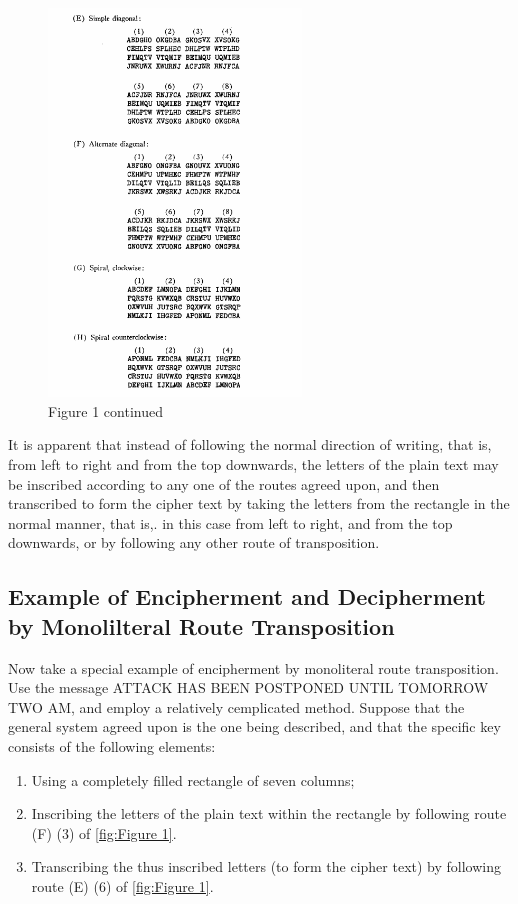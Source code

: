 \begin{figure}[h]
  \centering
    \includegraphics[width=0.6\textwidth,natwidth=481,natheight=736]{Chapter2_fig1Continued.png}
    \caption{Figure 1 continued}
\end{figure}


\mypara It is apparent that instead of following the normal direction of
writing, that is, from left to right and from the top downwards, the
letters of the plain text may be inscribed according to any one of the
routes agreed upon, and then transcribed to form the cipher text by
taking the letters from the rectangle in the normal manner, that is,. in
this case from left to right, and from the top downwards, or by following any other route of transposition.

\subsection{Example of Encipherment and Decipherment by Monolilteral Route Transposition}

\mypara Now take a special example of encipherment by monoliteral route
transposition. Use the message ATTACK HAS BEEN POSTPONED
UNTIL TOMORROW TWO AM, and employ a relatively cemplicated
method. Suppose that the general system agreed upon is the one being
described, and that the specific key consists of the following elements:

\begin{enumerate}
\item Using a completely filled rectangle of seven columns;

\item Inscribing the letters of the plain text within the rectangle by
following route (F) (3) of \ref{fig:Figure 1}.

\item Transcribing the thus inscribed letters (to form the cipher text)
by following route (E) (6) of \ref{fig:Figure 1}.
\end{enumerate}

